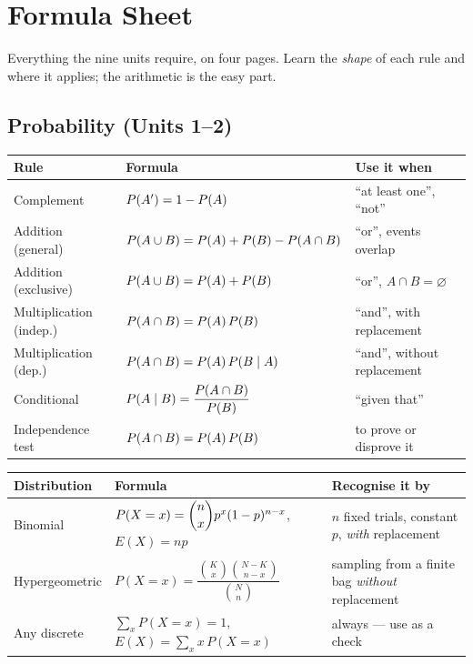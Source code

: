 \chapter{Formula Sheet}

Everything the nine units require, on four pages. Learn the \emph{shape} of
each rule and where it applies; the arithmetic is the easy part.

\section{Probability (Units 1--2)}

\begin{center}
\small
\begin{tabular}{@{}L{5.2cm} L{4.9cm} L{5.1cm}@{}}
\toprule
\textbf{Rule} & \textbf{Formula} & \textbf{Use it when} \\
\midrule
Complement & $P\!\left(A'\right)=1-P\!\left(A\right)$ & ``at least one'', ``not'' \\
Addition (general) & $P\!\left(A\cup B\right)=P\!\left(A\right)+P\!\left(B\right)-P\!\left(A\cap B\right)$ & ``or'', events overlap \\
Addition (exclusive) & $P\!\left(A\cup B\right)=P\!\left(A\right)+P\!\left(B\right)$ & ``or'', $A\cap B=\varnothing$ \\
Multiplication (indep.) & $P\!\left(A\cap B\right)=P\!\left(A\right)P\!\left(B\right)$ & ``and'', with replacement \\
Multiplication (dep.) & $P\!\left(A\cap B\right)=P\!\left(A\right)P\!\left(B\mid A\right)$ & ``and'', without replacement \\
Conditional & $P\!\left(A\mid B\right)=\dfrac{P\!\left(A\cap B\right)}{P\!\left(B\right)}$ & ``given that'' \\
Independence test & $P\!\left(A\cap B\right)=P\!\left(A\right)P\!\left(B\right)$ & to prove or disprove it \\
\bottomrule
\end{tabular}
\end{center}

\medskip
\begin{center}
\small
\begin{tabular}{@{}L{4.0cm} L{6.3cm} L{4.9cm}@{}}
\toprule
\textbf{Distribution} & \textbf{Formula} & \textbf{Recognise it by} \\
\midrule
Binomial &
$P(X=x)=\dbinom{n}{x}p^{x}(1-p)^{n-x}$, $E(X)=np$ &
$n$ fixed trials, constant $p$, \emph{with} replacement \\[6pt]
Hypergeometric &
$P(X=x)=\dfrac{\binom{K}{x}\binom{N-K}{n-x}}{\binom{N}{n}}$ &
sampling from a finite bag \emph{without} replacement \\[6pt]
Any discrete &
$\sum_x P(X=x)=1$, \quad $E(X)=\sum_x x\,P(X=x)$ &
always --- use as a check \\
\bottomrule
\end{tabular}
\end{center}

